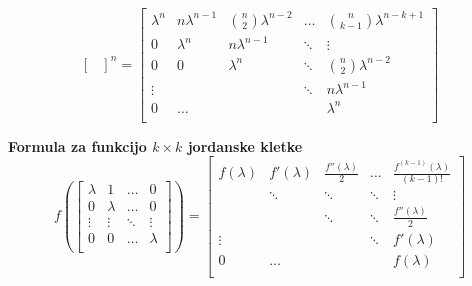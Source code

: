 \documentclass[a4paper,8pt]{extarticle}
\begin{document}
\begin{multicols}{3}
\[\begin{bmatrix}
    \end{bmatrix}^n
    =
    \begin{bmatrix}
        \lambda^n & n\lambda^{n-1} & \binom{n}{2}\lambda^{n-2} & \dots & \binom{n}{k-1}\lambda^{n-k+1} \\
        0 & \lambda^n & n\lambda^{n-1} & \ddots & \vdots \\
        0 & 0 & \lambda^n  & \ddots & \binom{n}{2}\lambda^{n-2} \\
        \vdots &  &  & \ddots & n\lambda^{n-1} \\
        0 & \dots &  &  & \lambda^n \\
    \end{bmatrix}
\]

\textbf{Formula za funkcijo $k \times k$ jordanske kletke}
\[
f(
\begin{bmatrix}
    \lambda & 1   & \dots & 0 \\
    0 & \lambda & \dots & 0 \\
    \vdots & \vdots & \ddots & \vdots \\    
    0 & 0 & \dots & \lambda \\
\end{bmatrix}
)
=
\begin{bmatrix}
    f(\lambda) & f'(\lambda) & \frac{f''(\lambda)}{2} & \dots & \frac{f^{(k-1)}(\lambda)}{(k-1)!} \\
     & \ddots & \ddots & \ddots & \vdots \\
     &  & \ddots & \ddots & \frac{f''(\lambda)}{2} \\
    \vdots &  &  & \ddots & f'(\lambda) \\
    0 & \dots &  &  & f(\lambda) \\
\end{bmatrix}
\]


\end{multicols}
\end{document}
